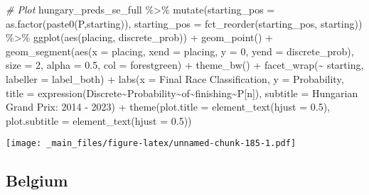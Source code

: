 \documentclass[
]{book}
\newenvironment{Shaded}{\begin{snugshade}}{\end{snugshade}}
\newcommand{\AttributeTok}[1]{\textcolor[rgb]{0.77,0.63,0.00}{#1}}
\newcommand{\CommentTok}[1]{\textcolor[rgb]{0.56,0.35,0.01}{\textit{#1}}}
\newcommand{\DecValTok}[1]{\textcolor[rgb]{0.00,0.00,0.81}{#1}}
\newcommand{\FloatTok}[1]{\textcolor[rgb]{0.00,0.00,0.81}{#1}}
\newcommand{\FunctionTok}[1]{\textcolor[rgb]{0.00,0.00,0.00}{#1}}
\newcommand{\NormalTok}[1]{#1}
\newcommand{\SpecialCharTok}[1]{\textcolor[rgb]{0.00,0.00,0.00}{#1}}
\newcommand{\StringTok}[1]{\textcolor[rgb]{0.31,0.60,0.02}{#1}}
\begin{document}
\begin{Shaded}
\begin{Highlighting}[]
\CommentTok{\# Plot}
\NormalTok{hungary\_preds\_se\_full }\SpecialCharTok{\%\textgreater{}\%}
  \FunctionTok{mutate}\NormalTok{(}\AttributeTok{starting\_pos =} \FunctionTok{as.factor}\NormalTok{(}\FunctionTok{paste0}\NormalTok{(}\StringTok{\textquotesingle{}P\textquotesingle{}}\NormalTok{,starting)),}
         \AttributeTok{starting\_pos =} \FunctionTok{fct\_reorder}\NormalTok{(starting\_pos, starting)) }\SpecialCharTok{\%\textgreater{}\%}
  \FunctionTok{ggplot}\NormalTok{(}\FunctionTok{aes}\NormalTok{(placing, discrete\_prob)) }\SpecialCharTok{+}
  \FunctionTok{geom\_point}\NormalTok{() }\SpecialCharTok{+}
  \FunctionTok{geom\_segment}\NormalTok{(}\FunctionTok{aes}\NormalTok{(}\AttributeTok{x =}\NormalTok{ placing, }\AttributeTok{xend =}\NormalTok{ placing, }\AttributeTok{y =} \DecValTok{0}\NormalTok{, }\AttributeTok{yend =}\NormalTok{ discrete\_prob),}
               \AttributeTok{size =} \DecValTok{2}\NormalTok{, }\AttributeTok{alpha =} \FloatTok{0.5}\NormalTok{, }\AttributeTok{col =} \StringTok{\textquotesingle{}forestgreen\textquotesingle{}}\NormalTok{) }\SpecialCharTok{+}
  \FunctionTok{theme\_bw}\NormalTok{() }\SpecialCharTok{+}
  \FunctionTok{facet\_wrap}\NormalTok{(}\SpecialCharTok{\textasciitilde{}}\NormalTok{ starting, }\AttributeTok{labeller =}\NormalTok{ label\_both) }\SpecialCharTok{+}
  \FunctionTok{labs}\NormalTok{(}\AttributeTok{x =} \StringTok{\textquotesingle{}Final Race Classification\textquotesingle{}}\NormalTok{,}
       \AttributeTok{y =} \StringTok{\textquotesingle{}Probability\textquotesingle{}}\NormalTok{,}
       \AttributeTok{title =} \FunctionTok{expression}\NormalTok{(Discrete}\SpecialCharTok{\textasciitilde{}}\NormalTok{Probability}\SpecialCharTok{\textasciitilde{}}\NormalTok{of}\SpecialCharTok{\textasciitilde{}}\NormalTok{finishing}\SpecialCharTok{\textasciitilde{}}\NormalTok{P[n]),}
       \AttributeTok{subtitle =} \StringTok{\textquotesingle{}Hungarian Grand Prix: 2014 {-} 2023\textquotesingle{}}\NormalTok{) }\SpecialCharTok{+}
  \FunctionTok{theme}\NormalTok{(}\AttributeTok{plot.title =} \FunctionTok{element\_text}\NormalTok{(}\AttributeTok{hjust =} \FloatTok{0.5}\NormalTok{),}
        \AttributeTok{plot.subtitle =} \FunctionTok{element\_text}\NormalTok{(}\AttributeTok{hjust =} \FloatTok{0.5}\NormalTok{)) }
\end{Highlighting}
\end{Shaded}

\texttt{[image: \_main\_files/figure-latex/unnamed-chunk-185-1.pdf]}

\hypertarget{belgium}{%
\subsection{Belgium}\label{belgium}}
\end{document}
